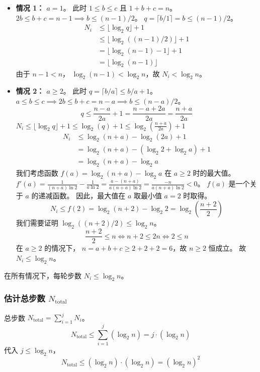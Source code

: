 \documentclass{ctexart}
\begin{document}
\begin{itemize}
    \item \textbf{情况 1： $a = 1$}。
    此时 $1 \le b \le c$ 且 $1+b+c = n$。
    $2b \le b+c = n-1 \implies b \le (n-1)/2$。
    $q = \lceil b / 1 \rceil = b \le (n-1)/2$。
    \begin{align*}
        N_i &\le \lfloor \log_2 q \rfloor + 1 \\
            &\le \lfloor \log_2((n-1)/2) \rfloor + 1 \\
            &= \lfloor \log_2(n-1) - 1 \rfloor + 1 \\
            &= \lfloor \log_2(n-1) \rfloor
    \end{align*}
    由于 $n-1 < n$， $\log_2(n-1) < \log_2 n$，故 $N_i < \log_2 n$。

    \item \textbf{情况 2： $a \ge 2$}。
    此时 $q = \lceil b/a \rceil \le b/a + 1$。
    $a \le b \le c \implies 2b \le b+c = n-a \implies b \le (n-a)/2$。
    $$ q \le \frac{n-a}{2a} + 1 = \frac{n-a+2a}{2a} = \frac{n+a}{2a} $$
    $N_i \le \lfloor \log_2 q \rfloor + 1 \le \log_2(q) + 1 \le \log_2\left(\frac{n+a}{2a}\right) + 1$
    \begin{align*}
        N_i &\le \log_2(n+a) - \log_2(2a) + 1 \\
            &= \log_2(n+a) - (\log_2 2 + \log_2 a) + 1 \\
            &= \log_2(n+a) - \log_2 a
    \end{align*}
    我们考虑函数 $f(a) = \log_2(n+a) - \log_2 a$ 在 $a \ge 2$ 时的最大值。
    $f'(a) = \frac{1}{(n+a)\ln 2} - \frac{1}{a \ln 2} = \frac{a - (n+a)}{a(n+a)\ln 2} = \frac{-n}{a(n+a)\ln 2} < 0$。
    $f(a)$ 是一个关于 $a$ 的递减函数。
    因此，最大值在 $a$ 取最小值 $a=2$ 时取得。
    $$ N_i \le f(2) = \log_2(n+2) - \log_2 2 = \log_2\left(\frac{n+2}{2}\right) $$
    我们需要证明 $\log_2((n+2)/2) \le \log_2 n$。
    $$ \frac{n+2}{2} \le n \iff n+2 \le 2n \iff 2 \le n $$
    在 $a \ge 2$ 的情况下， $n = a+b+c \ge 2+2+2=6$，故 $n \ge 2$ 恒成立。
    故 $N_i \le \log_2 n$。
\end{itemize}
在所有情况下，每轮步数 $N_i \le \log_2 n$。

\subsubsection{估计总步数 $N_{\text{total}}$}
总步数 $N_{\text{total}} = \sum_{i=1}^{j} N_i$。
$$ N_{\text{total}} \le \sum_{i=1}^{j} (\log_2 n) = j \cdot (\log_2 n) $$
代入 $j \le \log_2 n$，
$$ N_{\text{total}} \le (\log_2 n) \cdot (\log_2 n) = (\log_2 n)^2 $$
\end{document}
